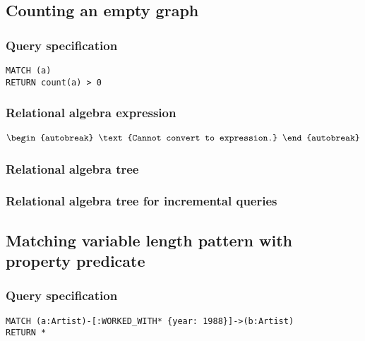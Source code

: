 \subsection{Counting an empty graph}

\subsubsection*{Query specification}

\begin{lstlisting}
MATCH (a)
RETURN count(a) > 0
\end{lstlisting}

\subsubsection*{Relational algebra expression}

\begin{align*}
\begin{autobreak}
\text{Cannot convert to expression.}
\end{autobreak}
\end{align*}

\subsubsection*{Relational algebra tree}


\subsubsection*{Relational algebra tree for incremental queries}


\subsection{Matching variable length pattern with property predicate}

\subsubsection*{Query specification}

\begin{lstlisting}
MATCH (a:Artist)-[:WORKED_WITH* {year: 1988}]->(b:Artist)
RETURN *
\end{lstlisting}

